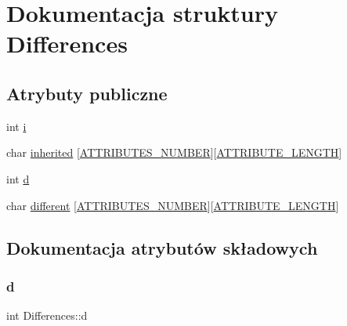\hypertarget{structDifferences}{}\section{Dokumentacja struktury Differences}
\label{structDifferences}
\subsection*{Atrybuty publiczne}
\begin{DoxyCompactItemize}
\item 
int \mbox{\hyperlink{structDifferences_aa157372af0f0f89046229ee794c8302c}{i}}
\item 
char \mbox{\hyperlink{structDifferences_a456dfa95ee434d6fc3d708b79426a5e0}{inherited}} \mbox{[}\mbox{\hyperlink{z6__12_8c_a0451336c3413f4eb65e2c11ca4d7e49b}{A\+T\+T\+R\+I\+B\+U\+T\+E\+S\+\_\+\+N\+U\+M\+B\+ER}}\mbox{]}\mbox{[}\mbox{\hyperlink{z6__12_8c_a6e6ab0a9b25e459ef3644befa7327a1d}{A\+T\+T\+R\+I\+B\+U\+T\+E\+\_\+\+L\+E\+N\+G\+TH}}\mbox{]}
\item 
int \mbox{\hyperlink{structDifferences_a1c81f00593d259bcbaef2455e385f241}{d}}
\item 
char \mbox{\hyperlink{structDifferences_af0b153ae77bd40b95e346fcb69847e7d}{different}} \mbox{[}\mbox{\hyperlink{z6__12_8c_a0451336c3413f4eb65e2c11ca4d7e49b}{A\+T\+T\+R\+I\+B\+U\+T\+E\+S\+\_\+\+N\+U\+M\+B\+ER}}\mbox{]}\mbox{[}\mbox{\hyperlink{z6__12_8c_a6e6ab0a9b25e459ef3644befa7327a1d}{A\+T\+T\+R\+I\+B\+U\+T\+E\+\_\+\+L\+E\+N\+G\+TH}}\mbox{]}
\end{DoxyCompactItemize}


\subsection{Dokumentacja atrybutów składowych}
\mbox{\label{structDifferences_a1c81f00593d259bcbaef2455e385f241}} 
\subsubsection{\texorpdfstring{d}{d}}
{\footnotesize\ttfamily int Differences\+::d}

\mbox{\label{structDifferences_af0b153ae77bd40b95e346fcb69847e7d}} 
